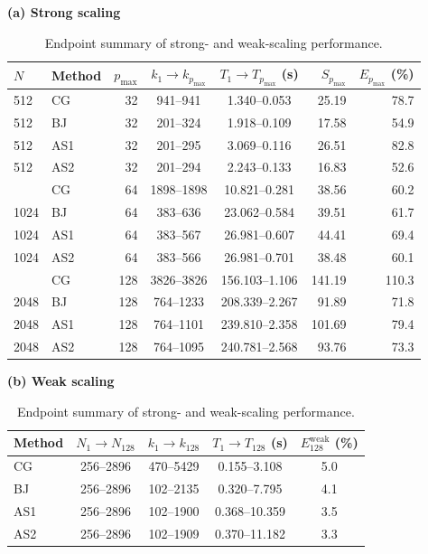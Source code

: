 \begin{table}[htbp]
    \centering
    \caption{Endpoint summary of strong- and weak-scaling performance.}
    \label{tab:scaling-summary}
    \small

    \textbf{(a) Strong scaling}
    \vspace{1mm}

    \setlength{\tabcolsep}{4pt}
    \begin{tabular}{llrccrr}
        \toprule
        $N$ & Method & $p_{\max}$ & $k_1\!\rightarrow\!k_{p_{\max}}$ & $T_1\!\rightarrow\!T_{p_{\max}}$ (s) & $S_{p_{\max}}$ & $E_{p_{\max}}$ (\%) \\
        \midrule
        512 & CG & 32 & 941--941 & 1.340--0.053 & 25.19 & 78.7 \\
        512 & BJ & 32 & 201--324 & 1.918--0.109 & 17.58 & 54.9 \\
        512 & AS1 & 32 & 201--295 & 3.069--0.116 & 26.51 & 82.8 \\
        512 & AS2 & 32 & 201--294 & 2.243--0.133 & 16.83 & 52.6 \\
        \addlinespace
        1024 & CG & 64 & 1898--1898 & 10.821--0.281 & 38.56 & 60.2 \\
        1024 & BJ & 64 & 383--636 & 23.062--0.584 & 39.51 & 61.7 \\
        1024 & AS1 & 64 & 383--567 & 26.981--0.607 & 44.41 & 69.4 \\
        1024 & AS2 & 64 & 383--566 & 26.981--0.701 & 38.48 & 60.1 \\
        \addlinespace
        2048 & CG & 128 & 3826--3826 & 156.103--1.106 & 141.19 & 110.3 \\
        2048 & BJ & 128 & 764--1233 & 208.339--2.267 & 91.89 & 71.8 \\
        2048 & AS1 & 128 & 764--1101 & 239.810--2.358 & 101.69 & 79.4 \\
        2048 & AS2 & 128 & 764--1095 & 240.781--2.568 & 93.76 & 73.3 \\
        \bottomrule
    \end{tabular}

    \vspace{3mm}
    \textbf{(b) Weak scaling}
    \vspace{1mm}

    \begin{tabular}{lcccc}
        \toprule
        Method & $N_1\!\rightarrow\!N_{128}$ & $k_1\!\rightarrow\!k_{128}$ & $T_1\!\rightarrow\!T_{128}$ (s) & $E^{\mathrm{weak}}_{128}$ (\%) \\
        \midrule
        CG & 256--2896 & 470--5429 & 0.155--3.108 & 5.0 \\
        BJ & 256--2896 & 102--2135 & 0.320--7.795 & 4.1 \\
        AS1 & 256--2896 & 102--1900 & 0.368--10.359 & 3.5 \\
        AS2 & 256--2896 & 102--1909 & 0.370--11.182 & 3.3 \\
        \bottomrule
    \end{tabular}


\end{table}
